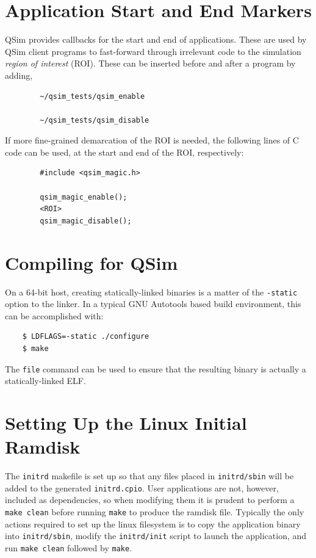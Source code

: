 \documentclass[letterpaper, 10pt]{book}
\begin{document}
\section{Application Start and End Markers}
QSim provides callbacks for the start and end of applications. These are used by
QSim client programs to fast-forward through irrelevant code to the simulation
\textit{region of interest} (ROI). These can be inserted before and after a
program by adding, 

\begin{verbatim}
        ~/qsim_tests/qsim_enable

        ~/qsim_tests/qsim_disable
\end{verbatim}

If more fine-grained demarcation of the ROI is needed, the following lines of
C code can be used, at the start and end of the ROI, respectively:

\begin{verbatim}
        #include <qsim_magic.h>

        qsim_magic_enable();
        <ROI>
        qsim_magic_disable();
\end{verbatim}

\section{Compiling for QSim}
On a 64-bit host, creating statically-linked binaries is a matter of 
the \texttt{-static} option to the linker. In a typical GNU Autotools based
build environment, this can be accomplished with:

\begin{verbatim}
    $ LDFLAGS=-static ./configure
    $ make
\end{verbatim}

The \texttt{file} command can be used to ensure that the resulting binary is
actually a statically-linked ELF.

\section{Setting Up the Linux Initial Ramdisk}
The \texttt{initrd} makefile is set up so that any files placed in 
\texttt{initrd/sbin} will be added to the generated \texttt{initrd.cpio}. User
applications are not, however, included as dependencies, so when modifying them
it is prudent to perform a \texttt{make clean} before running \texttt{make} to
produce the ramdisk file. Typically the only actions required to set up the
linux filesystem is to copy the application binary into \texttt{initrd/sbin},
modify the \texttt{initrd/init} script to launch the application, and run
\texttt{make clean} followed by \texttt{make}.
\end{document}
